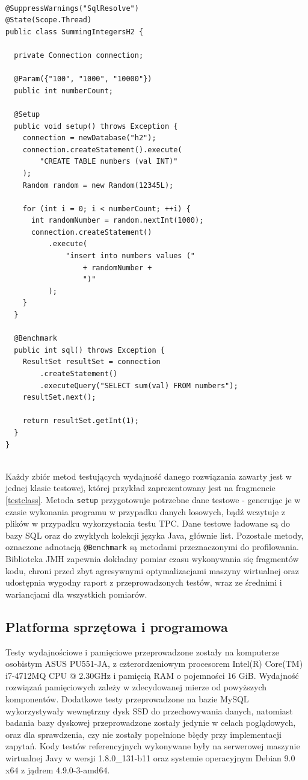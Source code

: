 \documentclass[12pt]{extarticle}
\begin{document}
\begin{lstlisting}[label=testclass, caption=Przykładowa klasa JMH]

@SuppressWarnings("SqlResolve")
@State(Scope.Thread)
public class SummingIntegersH2 {
  
  private Connection connection;
  
  @Param({"100", "1000", "10000"})
  public int numberCount;
  
  @Setup
  public void setup() throws Exception {
    connection = newDatabase("h2");
    connection.createStatement().execute(
        "CREATE TABLE numbers (val INT)"
    );
    Random random = new Random(12345L);
    
    for (int i = 0; i < numberCount; ++i) {
      int randomNumber = random.nextInt(1000);
      connection.createStatement()
          .execute(
              "insert into numbers values ("
                  + randomNumber +
                  ")"
          );
    }
  }
  
  @Benchmark
  public int sql() throws Exception {
    ResultSet resultSet = connection
        .createStatement()
        .executeQuery("SELECT sum(val) FROM numbers");
    resultSet.next();
    
    return resultSet.getInt(1);
  }
}


\end{lstlisting}

    Każdy zbiór metod testujących wydajność danego rozwiązania zawarty jest w jednej klasie testowej, której przykład zaprezentowany jest na fragmencie \ref{testclass}. Metoda \texttt{setup} przygotowuje potrzebne dane testowe - generując je w czasie wykonania programu w przypadku danych losowych, bądź wczytuje z plików w przypadku wykorzystania testu TPC. Dane testowe ładowane są do bazy SQL oraz do zwykłych kolekcji języka Java, głównie list. Pozostałe metody, oznaczone adnotacją \texttt{@Benchmark} są metodami przeznaczonymi do profilowania. Biblioteka JMH zapewnia dokładny pomiar czasu wykonywania się fragmentów kodu, chroni przed zbyt agresywnymi optymalizacjami maszyny wirtualnej oraz udostępnia wygodny raport z przeprowadzonych testów, wraz ze średnimi i wariancjami dla wszystkich pomiarów.


\subsection{Platforma sprzętowa i programowa}

    Testy wydajnościowe i pamięciowe przeprowadzone zostały na komputerze osobistym ASUS PU551-JA, z czterordzeniowym procesorem Intel(R) Core(TM) i7-4712MQ CPU @ 2.30GHz i pamięcią RAM o pojemności 16 GiB. Wydajność rozwiązań pamięciowych zależy w zdecydowanej mierze od powyższych komponentów. Dodatkowe testy przeprowadzone na bazie MySQL wykorzystywały wewnętrzny dysk SSD  do przechowywania danych, natomiast badania bazy dyskowej przeprowadzone zostały jedynie w celach poglądowych, oraz dla sprawdzenia, czy nie zostały popełnione błędy przy implementacji zapytań. Kody testów referencyjnych wykonywane były na serwerowej maszynie wirtualnej Javy w wersji 1.8.0\_131-b11 oraz systemie operacyjnym Debian 9.0 x64 z jądrem 4.9.0-3-amd64.
\end{document}

